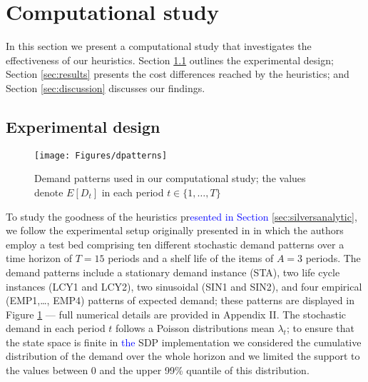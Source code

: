 \documentclass{tPRS2e}
\newcommand{\blue}{\textcolor{blue}}
\begin{document}



\section{Computational study}
\label{sec:computationalstudy}

In this section we present a computational study that investigates the effectiveness of our heuristics. Section \ref{sec:design} outlines the experimental design; Section \ref{sec:results} presents the cost differences reached by the heuristics; and Section \ref{sec:discussion} discusses our findings. 

\subsection{Experimental design}
\label{sec:design}
\begin{figure}[h!]
\centering
\texttt{[image: Figures/dpatterns]}
\caption{Demand patterns used in our computational study; the values denote $E[D_t]$ in each period $t \in \{1,\ldots,T\}$}
\label{fig:instances}
\end{figure}
To study the goodness of the heuristics pr\blue{esented in Section} \ref{sec:silversanalytic}, we follow the experimental setup originally presented in \cite{citeulike:13341691} in which the authors employ a test bed comprising ten different stochastic demand patterns over a time horizon of $T=15$ periods and a shelf life of the items of $A=3$ periods. The demand patterns include a stationary demand instance (STA), two life cycle instances (LCY1 and LCY2), two sinusoidal (SIN1 and SIN2), and four empirical (EMP1,\ldots, EMP4) patterns of expected demand; these patterns are displayed in Figure \ref{fig:instances} --- full numerical details are provided in Appendix II. The stochastic demand in each period $t$ follows a Poisson distributions mean $\lambda_t$; to ensure that the state space is finite in \blue{the} SDP implementation we considered the cumulative distribution of the demand over the whole horizon and we limited the support to the values between 0 and the upper 99\% quantile of this distribution. 
\end{document}
